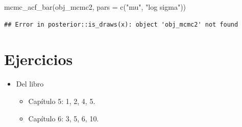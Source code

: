 \documentclass[
  12pt,
]{book}
\newenvironment{Shaded}{\begin{snugshade}}{\end{snugshade}}
\newcommand{\AttributeTok}[1]{\textcolor[rgb]{0.77,0.63,0.00}{#1}}
\newcommand{\FunctionTok}[1]{\textcolor[rgb]{0.00,0.00,0.00}{#1}}
\newcommand{\NormalTok}[1]{#1}
\newcommand{\StringTok}[1]{\textcolor[rgb]{0.31,0.60,0.02}{#1}}
\providecommand{\tightlist}{%
  \setlength{\itemsep}{0pt}\setlength{\parskip}{0pt}}
\theoremstyle{definition}
\theoremstyle{definition}
\theoremstyle{definition}
\theoremstyle{definition}
\theoremstyle{remark}
\begin{document}
\begin{Shaded}
\begin{Highlighting}[]
\FunctionTok{mcmc\_acf\_bar}\NormalTok{(obj\_mcmc2, }\AttributeTok{pars =} \FunctionTok{c}\NormalTok{(}\StringTok{"mu"}\NormalTok{, }\StringTok{"log sigma"}\NormalTok{))}
\end{Highlighting}
\end{Shaded}

\begin{verbatim}
## Error in posterior::is_draws(x): object 'obj_mcmc2' not found
\end{verbatim}

\hypertarget{ejercicios-7}{%
\section{Ejercicios}\label{ejercicios-7}}

\begin{itemize}
\tightlist
\item
  Del libro \autocite{Albert2009}

  \begin{itemize}
  \tightlist
  \item
    Capítulo 5: 1, 2, 4, 5.
  \item
    Capítulo 6: 3, 5, 6, 10.
  \end{itemize}
\end{itemize}

\printbibliography
\end{document}
